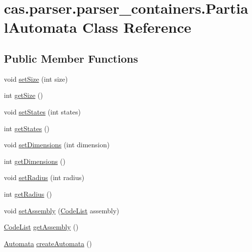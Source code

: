\hypertarget{classcas_1_1parser_1_1parser__containers_1_1_partial_automata}{\section{cas.\-parser.\-parser\-\_\-containers.\-Partial\-Automata Class Reference}
\label{classcas_1_1parser_1_1parser__containers_1_1_partial_automata}
}
\subsection*{Public Member Functions}
\begin{DoxyCompactItemize}
\item 
void \hyperlink{classcas_1_1parser_1_1parser__containers_1_1_partial_automata_a46a6c9a32727ec0d3425627750f2d7d9}{set\-Size} (int size)
\item 
int \hyperlink{classcas_1_1parser_1_1parser__containers_1_1_partial_automata_a473141f8ea8900c17a03c156023e2e95}{get\-Size} ()
\item 
void \hyperlink{classcas_1_1parser_1_1parser__containers_1_1_partial_automata_ab0aa9b6b8d16e9f119cfb2ad03eecc36}{set\-States} (int states)
\item 
int \hyperlink{classcas_1_1parser_1_1parser__containers_1_1_partial_automata_a493c7ed66d356fafc694f14c36e1dbb5}{get\-States} ()
\item 
void \hyperlink{classcas_1_1parser_1_1parser__containers_1_1_partial_automata_a163ac37f514e7f13db591dc9a35cd62d}{set\-Dimensions} (int dimension)
\item 
int \hyperlink{classcas_1_1parser_1_1parser__containers_1_1_partial_automata_a0063145e68ca2886ac2d43602b44a67d}{get\-Dimensions} ()
\item 
void \hyperlink{classcas_1_1parser_1_1parser__containers_1_1_partial_automata_a21214fa1fdc5bf4c2f33095010ad1476}{set\-Radius} (int radius)
\item 
int \hyperlink{classcas_1_1parser_1_1parser__containers_1_1_partial_automata_a160b3338bad053aa7a6fe4304e4d2c46}{get\-Radius} ()
\item 
void \hyperlink{classcas_1_1parser_1_1parser__containers_1_1_partial_automata_ab6e441164ca96df266e77361e1c7097b}{set\-Assembly} (\hyperlink{classcas_1_1parser_1_1parser__containers_1_1_code_list}{Code\-List} assembly)
\item 
\hyperlink{classcas_1_1parser_1_1parser__containers_1_1_code_list}{Code\-List} \hyperlink{classcas_1_1parser_1_1parser__containers_1_1_partial_automata_a4424462ab103cfeb289e79d85c8d1714}{get\-Assembly} ()
\item 
\hyperlink{classcas_1_1automata_1_1_automata}{Automata} \hyperlink{classcas_1_1parser_1_1parser__containers_1_1_partial_automata_a6335c558714b09c355c3c4dfb60ba5c8}{create\-Automata} ()
\end{DoxyCompactItemize}


